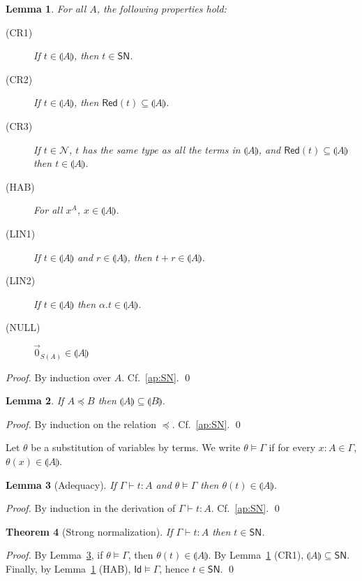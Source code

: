 \documentclass[preprint]{elsarticle}
\newtheorem{theorem}{Theorem}[section]
\newtheorem{lemma}[theorem]{Lemma}
\newcommand\interp[1]{\llparenthesis #1\rrparenthesis}
\newcommand\Red[1]{\mathsf{Red}(#1)}
\newcommand\SN{\mathsf{SN}}
\newcommand\z[1][A]{\vec 0_{S(#1)}}
\newcommand\nullvec[1]{\z[#1]}
\begin{document}
\begin{lemma}\label{lem:cr}
  For all \( A \), the following properties hold:
  \begin{description}
    \item[(CR1)] If \( t \in \interp{A} \), then \( t \in \SN \).
    \item[(CR2)] If \( t \in \interp{A} \), then \( \Red{t} \subseteq \interp{A} \).
    \item[(CR3)] If \( t \in \mathcal{N} \), $t$ has the same type as all the
      terms in $\interp A$, and \( \Red{t} \subseteq \interp{A} \) then \( t \in \interp{A} \).
    \item[(HAB)] For all \( x^A \), \( x \in \interp{A} \).
    \item[(LIN1)] If \( t \in \interp{A} \) and \( r \in \interp{A} \), then \( t + r \in \interp{A} \).
    \item[(LIN2)] If \( t \in \interp{A} \) then \( \alpha . t \in \interp{A} \).
    \item[(NULL)] \( \nullvec{A} \in \interp{A} \)
  \end{description}
\end{lemma}
\begin{proof}
  By induction over \( A \). Cf.~\ref{ap:SN}. \qed
\end{proof}

\begin{lemma}\label{lem:a_subset_b}
  If \( A \preceq B \) then \( \interp{A} \subseteq \interp{B} \).
\end{lemma}
\begin{proof}
  By induction on the relation $\preceq$. Cf.~\ref{ap:SN}. \qed
\end{proof}

Let $\theta$ be a substitution of variables by terms. We write
$\theta\vDash\Gamma$ if for every $x:A\in\Gamma$, $\theta(x)\in\interp A$.

\begin{lemma}[Adequacy]\label{lem:adequacy}
  If \( \Gamma \vdash t:A \) and \( \theta \vDash \Gamma \) then \( \theta(t)
  \in \interp{A} \).
\end{lemma}
\begin{proof}
  By induction in the derivation of $\Gamma\vdash t:A$. Cf.~\ref{ap:SN}. \qed
\end{proof}

\begin{theorem}
  [Strong normalization]\label{thm:SN}
  If $\Gamma\vdash t:A$ then $t\in\SN$.
\end{theorem}
\begin{proof}
  By Lemma~\ref{lem:adequacy}, if $\theta\vDash\Gamma$, then
  $\theta(t)\in\interp A$. By Lemma~\ref{lem:cr} (CR1), $\interp A\subseteq\SN$.
  Finally, by Lemma~\ref{lem:cr} (HAB), $\mathsf{Id}\vDash\Gamma$, hence $t\in\SN$.
  \qed
\end{proof}
\end{document}
